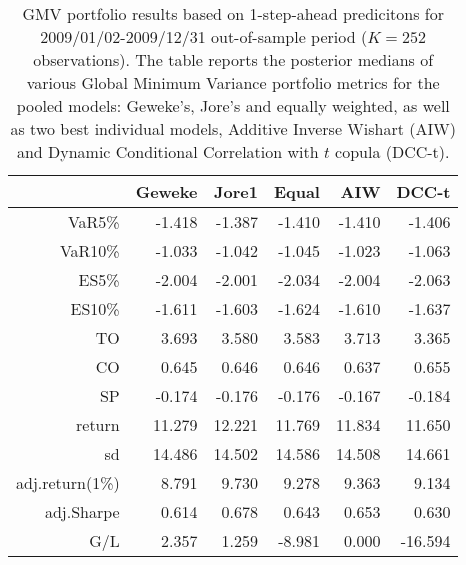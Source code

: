 \begin{table}[ht]
\centering
\caption{GMV portfolio results based on 1-step-ahead predicitons 
             for  2009/01/02-2009/12/31 out-of-sample period ($K=252$ observations).
             The table reports the posterior medians of various Global Minimum
             Variance portfolio metrics for the pooled models: 
             Geweke's, Jore's and equally weighted, 
             as well as two best individual models, Additive Inverse Wishart (AIW) and 
             Dynamic Conditional Correlation with $t$ copula (DCC-t).} 
\label{table:gmvfull1}
\begin{tabular}{rrrrrr}
  \hline
 & Geweke & Jore1 & Equal & AIW & DCC-t \\ 
  \hline
VaR5\% & -1.418 & -1.387 & -1.410 & -1.410 & -1.406 \\ 
  VaR10\% & -1.033 & -1.042 & -1.045 & -1.023 & -1.063 \\ 
  ES5\% & -2.004 & -2.001 & -2.034 & -2.004 & -2.063 \\ 
  ES10\% & -1.611 & -1.603 & -1.624 & -1.610 & -1.637 \\ 
  TO & 3.693 & 3.580 & 3.583 & 3.713 & 3.365 \\ 
  CO & 0.645 & 0.646 & 0.646 & 0.637 & 0.655 \\ 
  SP & -0.174 & -0.176 & -0.176 & -0.167 & -0.184 \\ 
   \hline
return & 11.279 & 12.221 & 11.769 & 11.834 & 11.650 \\ 
  sd & 14.486 & 14.502 & 14.586 & 14.508 & 14.661 \\ 
  adj.return(1\%) & 8.791 & 9.730 & 9.278 & 9.363 & 9.134 \\ 
  adj.Sharpe & 0.614 & 0.678 & 0.643 & 0.653 & 0.630 \\ 
  G/L & 2.357 & 1.259 & -8.981 & 0.000 & -16.594 \\ 
   \hline
\end{tabular}
\end{table}
